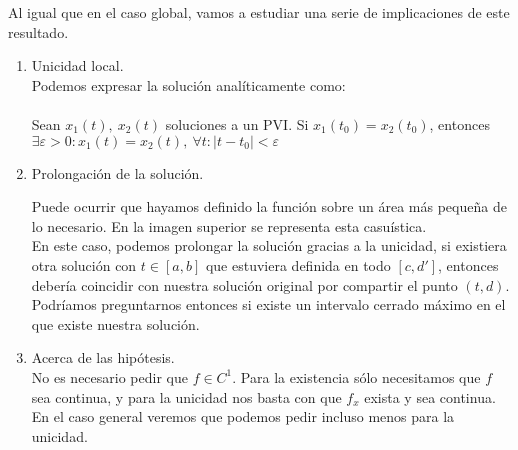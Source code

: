 \begin{obs}
    Al igual que en el caso global, vamos a estudiar una serie de implicaciones de este resultado.\\
    \begin{enumerate}
        \item Unicidad local.\\
        Podemos expresar la solución analíticamente como:\\\\
        Sean $x_1(t),\ x_2(t)$ soluciones a un PVI. Si $x_1(t_0) = x_2(t_0)$, entonces $ \exists \varepsilon>0: x_1(t) = x_2(t),\ \forall t : |t-t_0| < \varepsilon$
        \item Prolongación de la solución.\\
        \begin{center}
        \end{center}
        Puede ocurrir que hayamos definido la función sobre un área más pequeña de lo necesario. En la imagen superior se representa esta casuística.\\
        En este caso, podemos prolongar la solución gracias a la unicidad, si existiera otra solución con $t\in[a,b]$ que estuviera definida en todo $[c, d']$, entonces debería coincidir con nuestra solución original por compartir el punto $(t, d)$. Podríamos preguntarnos  entonces si existe un intervalo cerrado máximo en el que existe nuestra solución.
        \item Acerca de las hipótesis.\\
        No es necesario pedir que $f \in C^1$. Para la existencia sólo necesitamos que $f$ sea continua, y para la unicidad nos basta con que $f_x$ exista y sea continua. En el caso general veremos que podemos pedir incluso menos para la unicidad.
    \end{enumerate}
\end{obs}


